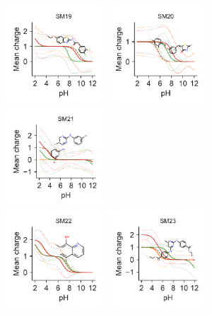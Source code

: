 \documentclass[9pt,lineno,final]{elife}
\begin{document}
 \begin{figure}[hbtp]	
	\centering
	\includegraphics[width=0.33\textwidth]{Reports/SM19-titrationcurve-views.pdf}
	\includegraphics[width=0.33\textwidth]{Reports/SM20-titrationcurve-views.pdf}
	\includegraphics[width=0.33\textwidth]{Reports/SM21-titrationcurve-views.pdf}	 \\
	\includegraphics[width=0.33\textwidth]{Reports/SM22-titrationcurve-views.pdf}
	\includegraphics[width=0.33\textwidth]{Reports/SM23-titrationcurve-views.pdf}

\end{figure}
\end{document}

